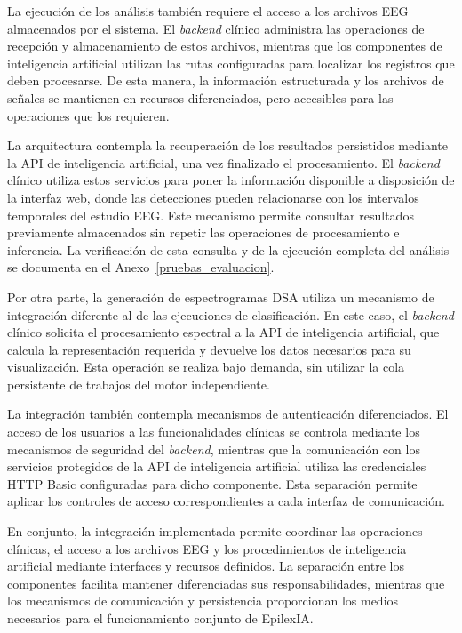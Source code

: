 La ejecución de los análisis también requiere el acceso
a los archivos EEG almacenados por el sistema. El \textit{backend}
clínico administra las operaciones de recepción y
almacenamiento de estos archivos, mientras que los
componentes de inteligencia artificial utilizan las
rutas configuradas para localizar los registros que
deben procesarse. De esta manera, la información
estructurada y los archivos de señales se mantienen
en recursos diferenciados, pero accesibles para las
operaciones que los requieren.


La arquitectura contempla la recuperación de los resultados persistidos mediante la API de inteligencia artificial, una vez finalizado el procesamiento. El \textit{backend} clínico utiliza estos servicios para poner la información disponible a disposición de la interfaz web, donde las detecciones pueden relacionarse con los intervalos temporales del estudio EEG. Este mecanismo permite consultar resultados previamente almacenados sin repetir las operaciones de procesamiento e inferencia. La verificación de esta consulta y de la ejecución completa del análisis se documenta en el Anexo~\ref{pruebas_evaluacion}.


Por otra parte, la generación de espectrogramas DSA
utiliza un mecanismo de integración diferente al de
las ejecuciones de clasificación. En este caso, el
\textit{backend} clínico solicita el procesamiento espectral
a la API de inteligencia artificial, que calcula
la representación requerida y devuelve los datos
necesarios para su visualización. Esta operación
se realiza bajo demanda, sin utilizar la cola
persistente de trabajos del motor independiente.

La integración también contempla mecanismos de
autenticación diferenciados. El acceso de los usuarios
a las funcionalidades clínicas se controla mediante
los mecanismos de seguridad del \textit{backend}, mientras
que la comunicación con los servicios protegidos
de la API de inteligencia artificial utiliza las
credenciales HTTP Basic configuradas para dicho
componente. Esta separación permite aplicar los
controles de acceso correspondientes a cada interfaz
de comunicación.

En conjunto, la integración implementada permite
coordinar las operaciones clínicas, el acceso a los
archivos EEG y los procedimientos de inteligencia
artificial mediante interfaces y recursos definidos.
La separación entre los componentes facilita mantener
diferenciadas sus responsabilidades, mientras que
los mecanismos de comunicación y persistencia
proporcionan los medios necesarios para el
funcionamiento conjunto de EpilexIA.


